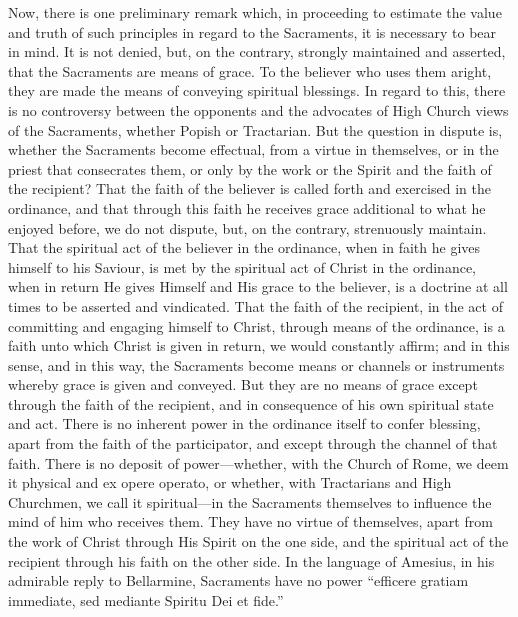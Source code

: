 \documentclass[]{book}
\begin{document}
Now, there is one preliminary remark which, in proceeding to estimate the value and truth of such principles in regard to the Sacraments, it is necessary to bear in mind. It is not denied, but, on the contrary, strongly maintained and asserted, that the Sacraments are means of grace. To the believer who uses them aright, they are made the means of conveying spiritual blessings. In regard to this, there is no controversy between the opponents and the advocates of High Church views of the Sacraments, whether Popish or Tractarian. But the question in dispute is, whether the Sacraments become effectual, from a virtue in themselves, or in the priest that consecrates them, or only by the work or the Spirit and the faith of the recipient? That the faith of the believer is called forth and exercised in the ordinance, and that through this faith he receives grace additional to what he enjoyed before, we do not dispute, but, on the contrary, strenuously maintain. That the spiritual act of the believer in the ordinance, when in faith he gives himself to his Saviour, is met by the spiritual act of Christ in the ordinance, when in return He gives Himself and His grace to the believer, is a doctrine at all times to be asserted and vindicated. That the faith of the recipient, in the act of committing and engaging himself to Christ, through means of the ordinance, is a faith unto which Christ is given in return, we would constantly affirm; and in this sense, and in this way, the Sacraments become means or channels or instruments whereby grace is given and conveyed. But they are no means of grace except through the faith of the recipient, and in consequence of his own spiritual state and act. There is no inherent power in the ordinance itself to confer blessing, apart from the faith of the participator, and except through the channel of that faith. There is no deposit of power---whether, with the Church of Rome, we deem it physical and ex opere operato, or whether, with Tractarians and High Churchmen, we call it spiritual---in the Sacraments themselves to influence the mind of him who receives them. They have no virtue of themselves, apart from the work of Christ through His Spirit on the one side, and the spiritual act of the recipient through his faith on the other side. In the language of Amesius, in his admirable reply to Bellarmine, Sacraments have no power ``efficere gratiam immediate, sed mediante Spiritu Dei et fide.''
\end{document}
